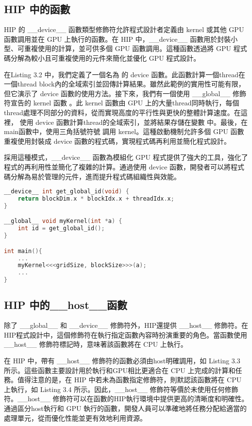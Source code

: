 \subsection{HIP 中的函數}
HIP 的 \_\_device\_\_ 函數類型修飾符允許程式設計者定義由 kernel 或其他 GPU 函數調用並在 GPU 上執行的函數。在 HIP 中，\_\_device\_\_ 函數用於封裝小型、可重複使用的計算，並可供多個 GPU 函數調用。這種函數透過將 GPU 程式碼分解為較小且可重複使用的元件來簡化並優化 GPU 程式設計。

在Listing 3.2 中，我們定義了一個名為  的 device 函數。此函數計算一個thread在一個thread block內的全域索引並回傳計算結果。雖然此範例的實用性可能有限，但它演示了 device 函數的使用方法。接下來，我們有一個使用 \_\_global\_\_ 修飾符宣告的 kernel 函數 。此 kernel 函數由 GPU 上的大量thread同時執行，每個thread處理不同部分的資料，從而實現高度的平行性與更快的整體計算速度。在這裡， 使用  device 函數計算thread的全域索引，並將結果存儲在變數  中。最後，在main函數中，使用三角括號符號 \code{<<< >>>} 調用 kernel。這種啟動機制允許多個 GPU 函數重複使用封裝成 device 函數的程式碼，實現程式碼再利用並簡化程式設計。

採用這種模式，\_\_device\_\_ 函數為模組化 GPU 程式提供了強大的工具，強化了程式的再利用性並簡化了複雜的計算。通過使用 device 函數，開發者可以將程式碼分解為易於管理的元件，進而提升程式碼組織性與效能。
\begin{lstlisting}[language=C, caption={在HIP kernel中使用\_\_device\_\_函數}, label={2nd:example}]
__device__ int get_global_id(void) {
    return blockDim.x * blockIdx.x + threadIdx.x;
}

__global__ void myKernel(int *a) {
    int id = get_global_id();
}

int main(){
    ...
    myKernel<<<gridSize, blockSize>>>(a);
    ...
}
\end{lstlisting}

\subsection{HIP 中的\_\_host\_\_函數}
除了 \_\_global\_\_ 和 \_\_device\_\_ 修飾符外，HIP還提供 \_\_host\_\_ 修飾符。在HIP程式設計中，這個修飾符在執行指定函數內容時扮演重要的角色。當函數使用\_\_host\_\_ 修飾符標記時，意味著該函數將在 CPU 上執行。

在 HIP 中，帶有 \_\_host\_\_ 修飾符的函數必須由host明確調用，如 Listing 3.3 所示。這些函數主要設計用於執行和GPU相比更適合在 CPU 上完成的計算和任務。值得注意的是，在 HIP 中若未為函數指定修飾符，則默認該函數將在 CPU 上執行，如 Listing 3.4 所示。因此，\_\_host\_\_ 修飾符等價於未使用任何修飾符。\_\_host\_\_ 修飾符可以在函數的HIP執行環境中提供更高的清晰度和明確性。通過區分host執行和 GPU 執行的函數，開發人員可以準確地將任務分配給適當的處理單元，從而優化性能並更有效地利用資源。

